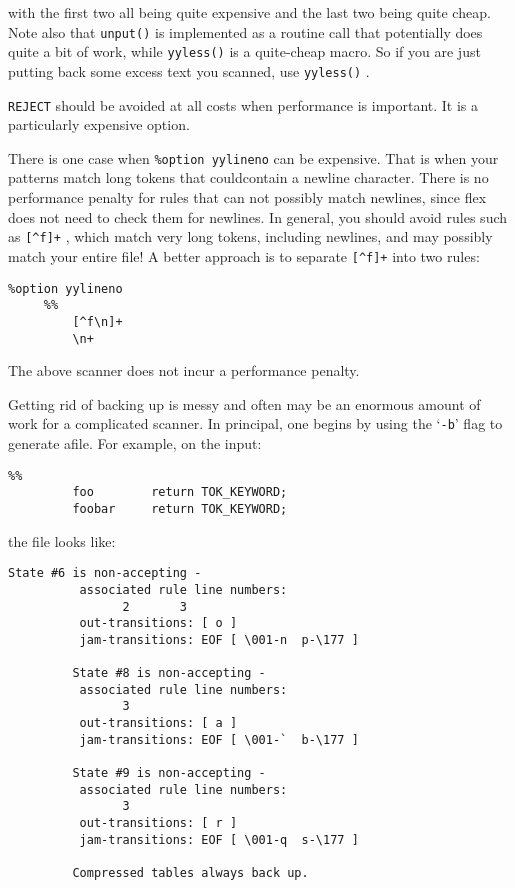 \documentclass[openany,oneside]{book}
\begin{document}
with the first two all being quite expensive and the last two being
quite cheap.  Note also that \verb`unput()` is implemented as a routine
call that potentially does quite a bit of work, while \verb`yyless()` is
a quite-cheap macro. So if you are just putting back some excess text
you scanned, use \verb`yyless()` .

 \verb`REJECT` should be avoided at all costs when performance is
important.  It is a particularly expensive option.

There is one case when \verb`%option yylineno` can be expensive. That is when
your patterns match long tokens that couldcontain a newline
character. There is no performance penalty for rules that can not possibly
match newlines, since flex does not need to check them for newlines.  In
general, you should avoid rules such as \verb`[^f]+` , which match very long
tokens, including newlines, and may possibly match your entire file! A better
approach is to separate \verb`[^f]+` into two rules:
\begin{verbatim}
%option yylineno
     %%
         [^f\n]+
         \n+
\end{verbatim}


The above scanner does not incur a performance penalty.

Getting rid of backing up is messy and often may be an enormous amount
of work for a complicated scanner.  In principal, one begins by using
the ‘\verb`-b`’ flag to generate afile.  For example,
on the input:


\begin{verbatim}
%%
         foo        return TOK_KEYWORD;
         foobar     return TOK_KEYWORD;
\end{verbatim}


the file looks like:
\begin{verbatim}
State #6 is non-accepting -
          associated rule line numbers:
                2       3
          out-transitions: [ o ]
          jam-transitions: EOF [ \001-n  p-\177 ]
     
         State #8 is non-accepting -
          associated rule line numbers:
                3
          out-transitions: [ a ]
          jam-transitions: EOF [ \001-`  b-\177 ]
     
         State #9 is non-accepting -
          associated rule line numbers:
                3
          out-transitions: [ r ]
          jam-transitions: EOF [ \001-q  s-\177 ]
     
         Compressed tables always back up.
\end{verbatim}
\end{document}
